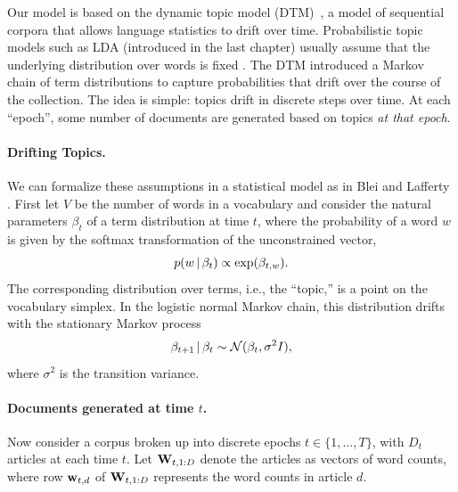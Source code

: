 Our model is based on the dynamic topic model (DTM)~\cite{blei:2006},
a model of sequential corpora that allows language statistics to drift
over time.  Probabilistic topic models such as LDA (introduced in the
last chapter) usually assume that the underlying distribution over
words is fixed \cite{blei:2003,deerwester:1990,hofmann:1999}. The DTM
introduced a Markov chain of term distributions to capture
probabilities that drift over the course of the collection.  The idea
is simple: topics drift in discrete steps over time.  At each
``epoch'', some number of documents are generated based on topics \emph{at that epoch}.

\paragraph{Drifting Topics.} We can formalize these assumptions in a
statistical model as in Blei and Lafferty \cite{blei:2006}.  First let
$V$ be the number of words in a vocabulary and consider the natural
parameters $\beta_t$ of a term distribution at time $t$, where the
probability of a word $w$ is given by the softmax transformation of
the unconstrained vector,
\begin{equation}
  \label{eq:softmax}
  p(w \, | \, \beta_{t}) \propto \exp(\beta_{t,w}).
\end{equation}
The corresponding distribution over terms, i.e., the ``topic,'' is a
point on the vocabulary simplex.  In the logistic normal Markov chain,
this distribution drifts with the stationary Markov process
\begin{equation}
  \label{eq:logistic-normal}
  \beta_{t+1} \, | \, \beta_t \sim \mathcal{N}(\beta_{t}, \sigma^2 I),
\end{equation}
where $\sigma^2$ is the transition variance. 

\paragraph{Documents generated at time $t$.} Now consider a corpus
broken up into discrete epochs $t \in \{ 1, \ldots, T \}$, with $D_t$
articles at each time $t$.  Let $\textbf{W}_{t,1:D}$ denote the articles as
vectors of word counts, where row $\textbf{w}_{t,d}$ of $\textbf{W}_{t, 1:D}$
represents the word counts in article $d$.

